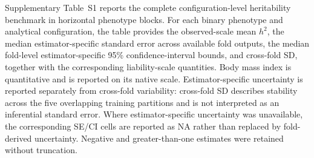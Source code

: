 Supplementary Table~S1 reports the complete configuration-level heritability benchmark in horizontal phenotype blocks. For each binary phenotype and analytical configuration, the table provides the observed-scale mean $h^2$, the median estimator-specific standard error across available fold outputs, the median fold-level estimator-specific 95\% confidence-interval bounds, and cross-fold SD, together with the corresponding liability-scale quantities. Body mass index is quantitative and is reported on its native scale. Estimator-specific uncertainty is reported separately from cross-fold variability: cross-fold SD describes stability across the five overlapping training partitions and is not interpreted as an inferential standard error. Where estimator-specific uncertainty was unavailable, the corresponding SE/CI cells are reported as NA rather than replaced by fold-derived uncertainty. Negative and greater-than-one estimates were retained without truncation.